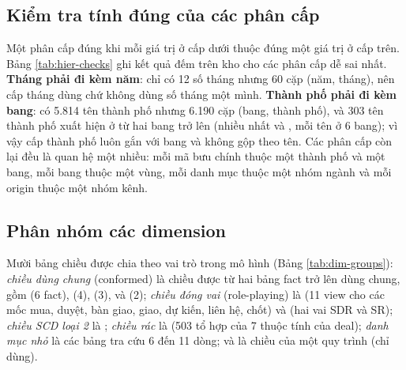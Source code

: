 \subsection{Kiểm tra tính đúng của các phân cấp}\label{sec:kiem-tra-phan-cap}
Một phân cấp đúng khi mỗi giá trị ở cấp dưới thuộc đúng một giá trị ở cấp trên. Bảng \ref{tab:hier-checks} ghi kết quả đếm trên kho cho các phân cấp dễ sai nhất. \textbf{Tháng phải đi kèm năm}: chỉ có 12 số tháng nhưng 60 cặp (năm, tháng), nên cấp tháng dùng  chứ không dùng số tháng một mình. \textbf{Thành phố phải đi kèm bang}: có 5.814 tên thành phố nhưng 6.190 cặp (bang, thành phố), và 303 tên thành phố xuất hiện ở từ hai bang trở lên (nhiều nhất  và , mỗi tên ở 6 bang); vì vậy cấp thành phố luôn gắn với bang và không gộp theo tên. Các phân cấp còn lại đều là quan hệ một nhiều: mỗi mã bưu chính thuộc một thành phố và một bang, mỗi bang thuộc một vùng, mỗi danh mục thuộc một nhóm ngành và mỗi origin thuộc một nhóm kênh.


\subsection{Phân nhóm các dimension}\label{sec:phan-nhom-dim}
Mười bảng chiều được chia theo vai trò trong mô hình (Bảng \ref{tab:dim-groups}): \emph{chiều dùng chung} (conformed) là chiều được từ hai bảng fact trở lên dùng chung, gồm  (6 fact),  (4),  (3),  và  (2); \emph{chiều đóng vai} (role-playing) là  (11 view cho các mốc mua, duyệt, bàn giao, giao, dự kiến, liên hệ, chốt) và  (hai vai SDR và SR); \emph{chiều SCD loại 2} là ; \emph{chiều rác} là  (503 tổ hợp của 7 thuộc tính của deal); \emph{danh mục nhỏ} là các bảng tra cứu 6 đến 11 dòng; và  là chiều của một quy trình (chỉ  dùng).

